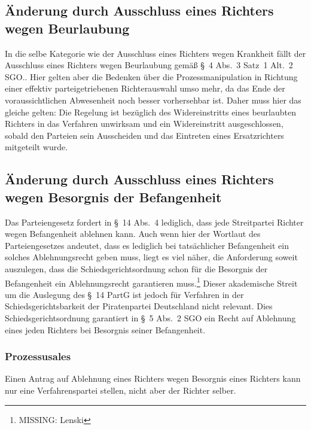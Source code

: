 \subsection{Änderung durch Ausschluss eines Richters wegen Beurlaubung}
\label{Zusammensetzung:Spruchkoerper:Urlaub}
In die selbe Kategorie wie der Ausschluss eines Richters wegen Krankheit fällt der Ausschluss eines Richters wegen Beurlaubung gemäß \S~4 Abs.~3 Satz~1 Alt.~2 SGO..
Hier gelten aber die Bedenken über die Prozessmanipulation in Richtung einer effektiv parteigetriebenen Richterauswahl umso mehr, da das Ende der voraussichtlichen Abwesenheit noch besser vorhersehbar ist.
Daher muss hier das gleiche gelten: Die Regelung ist bezüglich des Widereinstritts eines beurlaubten Richters in das Verfahren unwirksam und ein Widereinstritt ausgeschlossen, sobald den Parteien sein Ausscheiden und das Eintreten eines Ersatzrichters mitgeteilt wurde.

\subsection{Änderung durch Ausschluss eines Richters wegen Besorgnis der Befangenheit}
\label{Zusammensetzung:Spruchkoerper:Befangenheitsbesorgnis}
Das Parteiengesetz fordert in \S~14 Abs.~4 lediglich, dass jede Streitpartei Richter wegen Befangenheit ablehnen kann.
Auch wenn hier der Wortlaut des Parteiengesetzes andeutet, dass es lediglich bei tatsächlicher Befangenheit ein solches Ablehnungsrecht geben muss, liegt es viel näher, die Anforderung soweit auszulegen, dass die Schiedsgerichtsordnung schon für die Besorgnis der Befangenheit ein Ablehnungsrecht garantieren muss.\footnote{MISSING: Lenski}
Dieser akademische Streit um die Auslegung des \S~14 PartG ist jedoch für Verfahren in der Schiedsgerichtsbarkeit der Piratenpartei Deutschland nicht relevant.
Dies Schiedsgerichtsordnung garantiert in \S~5 Abs.~2 SGO ein Recht auf Ablehnung eines jeden Richters bei Besorgnis seiner Befangenheit.


\subsubsection{Prozessusales}
\label{Zusammensetzung:Spruchkoerper:Befangenheitsbesorgnis:Prozessuales}
Einen Antrag auf Ablehnung eines Richters wegen Besorgnis eines Richters kann nur eine Verfahrenspartei stellen, nicht aber der Richter selber.

